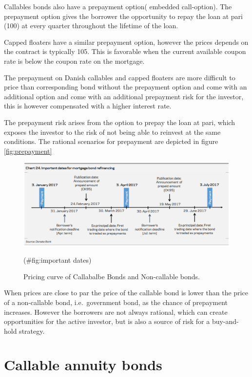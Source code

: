 \documentclass[12pt,twoside]{reedthesis}
\begin{document}
Callables bonds also have a prepayment option( embedded call-option). The prepayment option gives the borrower the opportunity to repay the loan at pari (100) at every quarter throughout the lifetime of the loan.

Capped floaters have a similar prepayment option, however the prices depends on the contract is typically 105. This is favorable when the current available coupon rate is below the coupon rate on the mortgage.

The prepayment on Danish callables and capped floaters are more difficult to price than corresponding bond without the prepayment option and come with an additional option and come with an additional prepayment risk for the investor, this is however compensated with a higher interest rate.

The prepayment risk arises from the option to prepay the loan at pari, which exposes the investor to the risk of not being able to reinvest at the same conditions. The rational scenarios for prepayment are depicted in figure \ref{fig:prepayment}
\begin{figure}

{\centering \includegraphics[width=1\linewidth]{figure/Prepayment_notice_dates} 

}

\caption{Pricing curve of Callabalbe Bonds and Non-callable bonds.}(\#fig:important dates)
\end{figure}
When prices are close to par the price of the callable bond is lower than the price of a non-callable bond, i.e.~government bond, as the chance of prepayment increases. However the borrowers are not always rational, which can create opportunities for the active investor, but is also a source of risk for a buy-and-hold strategy.

\hypertarget{callable-annuity-bonds}{%
\section{Callable annuity bonds}\label{callable-annuity-bonds}}
\end{document}

